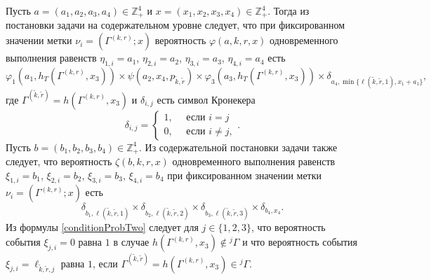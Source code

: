 \documentclass[a4paper,12pt,russian]{extarticle}
\begin{document}
Пусть $a=(a_1, a_2, a_3, a_4) \in \mathbb{Z}_+^4$ и $x=(x_1, x_2, x_3, x_4) \in \mathbb{Z}_+^4$. Тогда из постановки задачи на содержательном уровне следует, что при фиксированном значении метки $\nu_i=(\Gamma^{(k,r)}; x)$ вероятность $\varphi(a,k,r,x)$ одновременного выполнения равенств $\eta_{1,i}=a_1$, $\eta_{2,i}=a_2$, $\eta_{3,i}=a_3$, $\eta_{4,i}=a_4$ есть 
\begin{equation}
\varphi_1(a_1,h_T(\Gamma^{(k,r)},x_3)) \times \psi(a_2,x_4, p_{\tilde{k},\tilde{r}}) \times \varphi_3(a_3,h_T(\Gamma^{(k,r)},x_3))
\times \delta_{a_4,\min{\{\ell(\tilde{k},\tilde{r},1), x_1+a_1}\}},
\label{conditionProbOne}
\end{equation}
где $\Gamma^{(\tilde{k},\tilde{r})}=h(\Gamma^{(k,r)},x_3)$ и $\delta_{i,j}$ есть символ Кронекера
\begin{equation*}
\delta_{i,j}=\begin{cases} 1, \quad \text{ если }i=j\\0, \quad \text{ если } i\neq j,
\end{cases}.
\end{equation*}
Пусть $b=(b_1, b_2, b_3, b_4) \in \mathbb{Z}_+^4$. Из содержательной постановки задачи также следует, что вероятность $\zeta(b, k, r, x)$ одновременного выполнения равенств $\xi_{1,i}=b_1$, $\xi_{2,i}=b_2$, $\xi_{3,i}=b_3$, $\xi_{4,i}=b_4$ при фиксированном значении метки $\nu_i=(\Gamma^{(k,r)}; x)$ есть
\begin{equation}
\delta_{b_1,\ell(\tilde{k},\tilde{r},1)} \times \delta_{b_2,\ell(\tilde{k},\tilde{r},2)} \times 
\delta_{b_3,\ell(\tilde{k},\tilde{r},3)} \times \delta_{b_4,x_4}.
\label{conditionProbTwo}
\end{equation}
Из формулы \eqref{conditionProbTwo} следует для $j\in \{1, 2, 3\}$, что вероятность события $\xi_{j,i}=0$ равна $1$ в случае $h(\Gamma^{(k,r)},x_3)\notin {}^j\Gamma$ и что вероятность события $\xi_{j,i}=\ell_{\tilde{k},\tilde{r},j}$ равна $1$, если $\Gamma^{(\tilde{k},\tilde{r})}=h(\Gamma^{(k,r)},x_3)\in {}^j\Gamma$.
\end{document}
